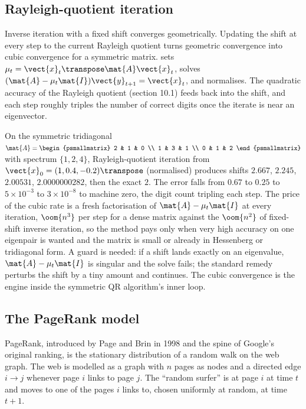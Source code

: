 \subsection{Rayleigh-quotient iteration}

Inverse iteration with a fixed shift converges geometrically.
Updating the shift at every step to the current Rayleigh quotient
turns geometric convergence into cubic convergence for a symmetric
matrix.  sets $\mu_{t} =
\vect{x}_{t}\transpose \mat{A} \vect{x}_{t}$, solves
$(\mat{A} - \mu_{t} \mat{I})\vect{y}_{t+1} = \vect{x}_{t}$, and
normalises. The quadratic accuracy of the Rayleigh quotient (section
10.1) feeds back into the shift, and each step roughly triples the
number of correct digits once the iterate is near an eigenvector.

\begin{example}
On the symmetric tridiagonal $\mat{A} = \begin{psmallmatrix} 2 & 1 & 0
\\ 1 & 3 & 1 \\ 0 & 1 & 2 \end{psmallmatrix}$ with spectrum
$\{1, 2, 4\}$, Rayleigh-quotient iteration from $\vect{x}_{0} =
(1, 0.4, -0.2)\transpose$ (normalised) produces shifts $2.667$,
$2.245$, $2.00531$, $2.0000000282$, then the exact $2$. The error
falls from $0.67$ to $0.25$ to $5 \times 10^{-3}$ to $3 \times
10^{-8}$ to machine zero, the digit count tripling each step. The
price of the cubic rate is a fresh factorisation of $\mat{A} - \mu_{t}
\mat{I}$ at every iteration, $\oom{n^{3}}$ per step for a dense
matrix against the $\oom{n^{2}}$ of fixed-shift inverse iteration, so
the method pays only when very high accuracy on one eigenpair is
wanted and the matrix is small or already in Hessenberg or
tridiagonal form. A guard is needed: if a shift lands exactly on an
eigenvalue, $\mat{A} - \mu_{t} \mat{I}$ is singular and the solve
fails; the standard remedy perturbs the shift by a tiny amount and
continues. The cubic convergence is the engine inside the symmetric
QR algorithm's inner loop.
\end{example}

\subsection{The PageRank model}

PageRank, introduced by Page and Brin in 1998 and the spine of
Google's original ranking, is the stationary distribution of a
random walk on the web graph. The web is modelled as a graph with
$n$ pages as nodes and a directed edge $i \to j$ whenever page $i$
links to page $j$. The ``random surfer'' is at page $i$ at time $t$
and moves to one of the pages $i$ links to, chosen uniformly at
random, at time $t+1$.

